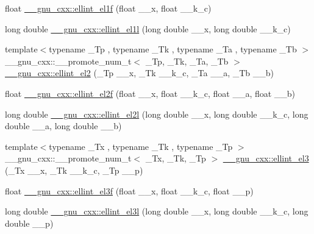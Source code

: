 \begin{DoxyCompactItemize}
\item 
float \hyperlink{group__gnu__math__spec__func_ga8d8342bb4f42c7fe09b5589c54d4e713}{\+\_\+\+\_\+gnu\+\_\+cxx\+::ellint\+\_\+el1f} (float \+\_\+\+\_\+x, float \+\_\+\+\_\+k\+\_\+c)
\item 
long double \hyperlink{group__gnu__math__spec__func_gaeed1201e421be410460739048cba5cd8}{\+\_\+\+\_\+gnu\+\_\+cxx\+::ellint\+\_\+el1l} (long double \+\_\+\+\_\+x, long double \+\_\+\+\_\+k\+\_\+c)
\item 
{\footnotesize template$<$typename \+\_\+\+Tp , typename \+\_\+\+Tk , typename \+\_\+\+Ta , typename \+\_\+\+Tb $>$ }\\\+\_\+\+\_\+gnu\+\_\+cxx\+::\+\_\+\+\_\+promote\+\_\+num\+\_\+t$<$ \+\_\+\+Tp, \+\_\+\+Tk, \+\_\+\+Ta, \+\_\+\+Tb $>$ \hyperlink{group__gnu__math__spec__func_ga1a6bd1d29fe62172ddb40e200a2d0d1f}{\+\_\+\+\_\+gnu\+\_\+cxx\+::ellint\+\_\+el2} (\+\_\+\+Tp \+\_\+\+\_\+x, \+\_\+\+Tk \+\_\+\+\_\+k\+\_\+c, \+\_\+\+Ta \+\_\+\+\_\+a, \+\_\+\+Tb \+\_\+\+\_\+b)
\item 
float \hyperlink{group__gnu__math__spec__func_ga0bf7469fe7ac92e9a2ffa0f92ea62248}{\+\_\+\+\_\+gnu\+\_\+cxx\+::ellint\+\_\+el2f} (float \+\_\+\+\_\+x, float \+\_\+\+\_\+k\+\_\+c, float \+\_\+\+\_\+a, float \+\_\+\+\_\+b)
\item 
long double \hyperlink{group__gnu__math__spec__func_ga491439a09e6000659444f52dc3c9f215}{\+\_\+\+\_\+gnu\+\_\+cxx\+::ellint\+\_\+el2l} (long double \+\_\+\+\_\+x, long double \+\_\+\+\_\+k\+\_\+c, long double \+\_\+\+\_\+a, long double \+\_\+\+\_\+b)
\item 
{\footnotesize template$<$typename \+\_\+\+Tx , typename \+\_\+\+Tk , typename \+\_\+\+Tp $>$ }\\\+\_\+\+\_\+gnu\+\_\+cxx\+::\+\_\+\+\_\+promote\+\_\+num\+\_\+t$<$ \+\_\+\+Tx, \+\_\+\+Tk, \+\_\+\+Tp $>$ \hyperlink{group__gnu__math__spec__func_ga62f3a824cc224012ed4328a2d3709dcc}{\+\_\+\+\_\+gnu\+\_\+cxx\+::ellint\+\_\+el3} (\+\_\+\+Tx \+\_\+\+\_\+x, \+\_\+\+Tk \+\_\+\+\_\+k\+\_\+c, \+\_\+\+Tp \+\_\+\+\_\+p)
\item 
float \hyperlink{group__gnu__math__spec__func_ga66131a8ecc14b5228a73a01121f60a35}{\+\_\+\+\_\+gnu\+\_\+cxx\+::ellint\+\_\+el3f} (float \+\_\+\+\_\+x, float \+\_\+\+\_\+k\+\_\+c, float \+\_\+\+\_\+p)
\item 
long double \hyperlink{group__gnu__math__spec__func_ga0d90e66f799a2ebe4bec43eef0d53355}{\+\_\+\+\_\+gnu\+\_\+cxx\+::ellint\+\_\+el3l} (long double \+\_\+\+\_\+x, long double \+\_\+\+\_\+k\+\_\+c, long double \+\_\+\+\_\+p)

\end{DoxyCompactItemize}
